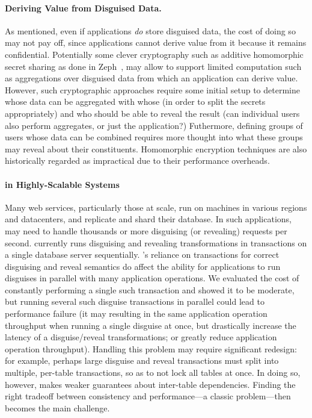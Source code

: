 \paragraph{Deriving Value from Disguised Data.} As mentioned, even if
applications \emph{do} store disguised data, the cost of doing so may not pay
off, since applications cannot derive value from it because it remains
confidential. 
%
Potentially some clever cryptography such as additive homomorphic secret sharing
as done in Zeph~\cite{zeph}, may allow \sys to support limited computation such
as aggregations over disguised data from which an application can derive value.
%
However, such cryptographic approaches require some initial setup to determine
whose data can be aggregated with whose (in order to split the secrets
appropriately) and who should be able to reveal the result (can individual users
also perform aggregates, or just the application?) Futhermore, defining groups
of users whose data can be combined requires more thought into what these groups
may reveal about their constituents.
%
Homomorphic encryption techniques are also historically regarded as impractical
due to their performance overheads.
%

\paragraph{\sys in Highly-Scalable Systems}
Many web services, particularly those at scale, run on machines in various
regions and datacenters, and replicate and shard their database.
%
In such applications, \sys may need to handle thousands or more disguising (or
revealing) requests per second.
%
\sys currently runs disguising and revealing transformations in transactions on
a single database server sequentially. 
%
\sys's reliance on transactions for correct disguising and reveal semantics do
affect the ability for applications to run disguises in parallel with many
application operations.
%
We evaluated the cost of constantly performing a single such transaction and
showed it to be moderate, but running several such disguise transactions in
parallel could lead to performance failure (\eg it may resulting in the same
application operation throughput when running a single disguise at once, but
drastically increase the latency of a disguise/reveal transformations; or
greatly reduce application operation throughput).
%
Handling this problem may require significant redesign: for example, perhaps
large disguise and reveal transactions must split into multiple, per-table
transactions, so as to not lock all tables at once. In doing so, however, \sys
makes weaker guarantees about inter-table dependencies. Finding the right
tradeoff between consistency and performance---a classic problem---then
becomes the main challenge.
%

